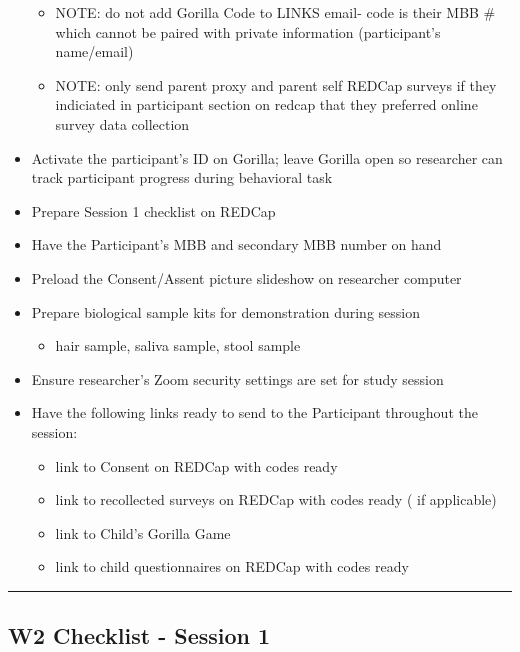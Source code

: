 \documentclass[
]{book}
\providecommand{\tightlist}{%
  \setlength{\itemsep}{0pt}\setlength{\parskip}{0pt}}
\begin{document}
\begin{itemize}
  \begin{itemize}
  \tightlist
  \item
    NOTE: do not add Gorilla Code to LINKS email- code is their MBB \# which cannot be paired with private information (participant's name/email)
  \item
    NOTE: only send parent proxy and parent self REDCap surveys if they indiciated in participant section on redcap that they preferred online survey data collection
  \end{itemize}
\item
  Activate the participant's ID on Gorilla; leave Gorilla open so researcher can track participant progress during behavioral task
\item
  Prepare Session 1 checklist on REDCap
\item
  Have the Participant's MBB and secondary MBB number on hand
\item
  Preload the Consent/Assent picture slideshow on researcher computer
\item
  Prepare biological sample kits for demonstration during session

  \begin{itemize}
  \tightlist
  \item
    hair sample, saliva sample, stool sample
  \end{itemize}
\item
  Ensure researcher's Zoom security settings are set for study session
\item
  Have the following links ready to send to the Participant throughout the session:

  \begin{itemize}
  \tightlist
  \item
    link to Consent on REDCap with codes ready
  \item
    link to recollected surveys on REDCap with codes ready ( if applicable)
  \item
    link to Child's Gorilla Game
  \item
    link to child questionnaires on REDCap with codes ready
  \end{itemize}
\end{itemize}

\begin{center}\rule{0.5\linewidth}{0.5pt}\end{center}

\hypertarget{w2-checklist---session-1}{%
\subsection{W2 Checklist - Session 1}\label{w2-checklist---session-1}}
\end{document}
